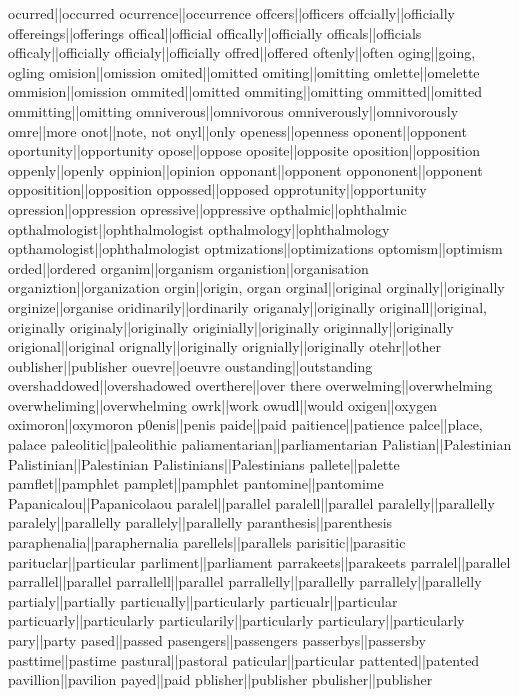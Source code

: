 ocurred||occurred
ocurrence||occurrence
offcers||officers
offcially||officially
offereings||offerings
offical||official
offically||officially
officals||officials
officaly||officially
officialy||officially
offred||offered
oftenly||often
oging||going, ogling
omision||omission
omited||omitted
omiting||omitting
omlette||omelette
ommision||omission
ommited||omitted
ommiting||omitting
ommitted||omitted
ommitting||omitting
omniverous||omnivorous
omniverously||omnivorously
omre||more
onot||note, not
onyl||only
openess||openness
oponent||opponent
oportunity||opportunity
opose||oppose
oposite||opposite
oposition||opposition
oppenly||openly
oppinion||opinion
opponant||opponent
oppononent||opponent
oppositition||opposition
oppossed||opposed
opprotunity||opportunity
opression||oppression
opressive||oppressive
opthalmic||ophthalmic
opthalmologist||ophthalmologist
opthalmology||ophthalmology
opthamologist||ophthalmologist
optmizations||optimizations
optomism||optimism
orded||ordered
organim||organism
organistion||organisation
organiztion||organization
orgin||origin, organ
orginal||original
orginally||originally
orginize||organise
oridinarily||ordinarily
origanaly||originally
originall||original, originally
originaly||originally
originially||originally
originnally||originally
origional||original
orignally||originally
orignially||originally
otehr||other
oublisher||publisher
ouevre||oeuvre
oustanding||outstanding
overshaddowed||overshadowed
overthere||over there
overwelming||overwhelming
overwheliming||overwhelming
owrk||work
owudl||would
oxigen||oxygen
oximoron||oxymoron
p0enis||penis
paide||paid
paitience||patience
palce||place, palace
paleolitic||paleolithic
paliamentarian||parliamentarian
Palistian||Palestinian
Palistinian||Palestinian
Palistinians||Palestinians
pallete||palette
pamflet||pamphlet
pamplet||pamphlet
pantomine||pantomime
Papanicalou||Papanicolaou
paralel||parallel
paralell||parallel
paralelly||parallelly
paralely||parallelly
parallely||parallelly
paranthesis||parenthesis
paraphenalia||paraphernalia
parellels||parallels
parisitic||parasitic
parituclar||particular
parliment||parliament
parrakeets||parakeets
parralel||parallel
parrallel||parallel
parrallell||parallel
parrallelly||parallelly
parrallely||parallelly
partialy||partially
particually||particularly
particualr||particular
particuarly||particularly
particularily||particularly
particulary||particularly
pary||party
pased||passed
pasengers||passengers
passerbys||passersby
pasttime||pastime
pastural||pastoral
paticular||particular
pattented||patented
pavillion||pavilion
payed||paid
pblisher||publisher
pbulisher||publisher
